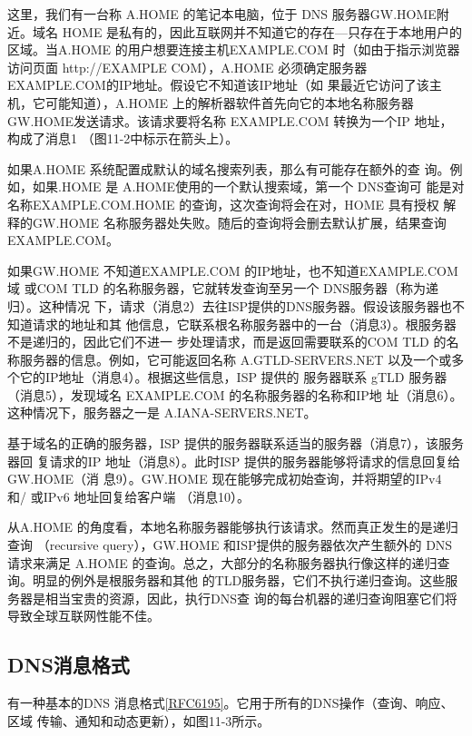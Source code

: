 这里，我们有一台称 A.HOME 的笔记本电脑，位于 DNS 服务器GW.HOME附近。域名
HOME 是私有的，因此互联网并不知道它的存在—只存在于本地用户的区域。当A.HOME
的用户想要连接主机EXAMPLE.COM 时（如由于指示浏览器访问页面 http://EXAMPLE
COM），A.HOME 必须确定服务器EXAMPLE.COM的IP地址。假设它不知道该IP地址（如
果最近它访问了该主机，它可能知道），A.HOME 上的解析器软件首先向它的本地名称服务器
GW.HOME发送请求。该请求要将名称 EXAMPLE.COM 转换为一个IP 地址，构成了消息1
（图11-2中标示在箭头上）。

\begin{tcolorbox}
  如果A.HOME 系统配置成默认的域名搜索列表，那么有可能存在额外的查
  询。例如，如果.HOME 是 A.HOME使用的一个默认搜索域，第一个 DNS查询可
  能是对名称EXAMPLE.COM.HOME 的查询，这次查询将会在对，HOME 具有授权
  解释的GW.HOME 名称服务器处失败。随后的查询将会删去默认扩展，结果查询
  EXAMPLE.COM。
\end{tcolorbox}

如果GW.HOME 不知道EXAMPLE.COM 的IP地址，也不知道EXAMPLE.COM域
或COM TLD 的名称服务器，它就转发查询至另一个 DNS服务器（称为递归）。这种情况
下，请求（消息2）去往ISP提供的DNS服务器。假设该服务器也不知道请求的地址和其
他信息，它联系根名称服务器中的一台（消息3）。根服务器不是递归的，因此它们不进一
步处理请求，而是返回需要联系的COM TLD 的名称服务器的信息。例如，它可能返回名称
A.GTLD-SERVERS.NET 以及一个或多个它的IP地址（消息4）。根据这些信息，ISP 提供的
服务器联系 gTLD 服务器（消息5），发现域名 EXAMPLE.COM 的名称服务器的名称和IP地
址（消息6）。这种情况下，服务器之一是 A.IANA-SERVERS.NET。

基于域名的正确的服务器，ISP 提供的服务器联系适当的服务器（消息7），该服务器回
复请求的IP 地址（消息8）。此时ISP 提供的服务器能够将请求的信息回复给GW.HOME（消
息9）。GW.HOME 现在能够完成初始查询，并将期望的IPv4 和/ 或IPv6 地址回复给客户端
（消息10）。

从A.HOME 的角度看，本地名称服务器能够执行该请求。然而真正发生的是递归查询
（recursive query），GW.HOME 和ISP提供的服务器依次产生额外的 DNS 请求来满足 A.HOME
的查询。总之，大部分的名称服务器执行像这样的递归查询。明显的例外是根服务器和其他
的TLD服务器，它们不执行递归查询。这些服务器是相当宝贵的资源，因此，执行DNS查
询的每台机器的递归查询阻塞它们将导致全球互联网性能不佳。

\subsection{DNS消息格式}

有一种基本的DNS
消息格式\href{https://www.rfc-editor.org/rfc/rfc6195}{[RFC6195]}。它用于所有的DNS操作（查询、响应、区域
传输、通知和动态更新），如图11-3所示。

